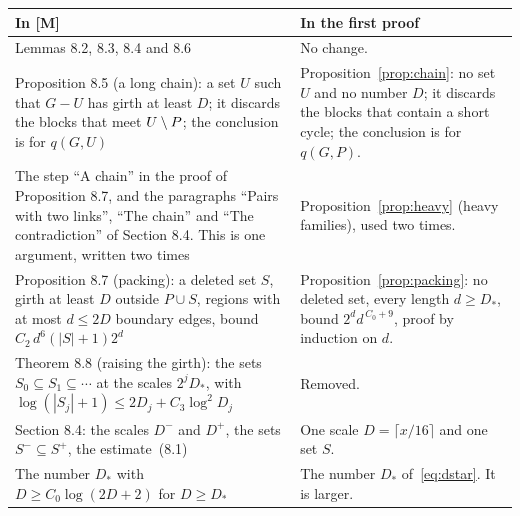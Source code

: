 \documentclass[11pt]{article}
\begin{document}
\begin{center}
\small
\begin{tabular}{@{}p{7.1cm}p{7.1cm}@{}}
\toprule
In [M] & In the first proof\\
\midrule
Lemmas 8.2, 8.3, 8.4 and 8.6 & No change.\\\addlinespace
Proposition 8.5 (a long chain): a set $U$ such that $G-U$ has girth at least $D$; it discards the
blocks that meet $U\setminus P$; the conclusion is for $q(G,U)$ &
Proposition~\ref{prop:chain}: no set $U$ and no number $D$; it discards the blocks that contain
a short cycle; the conclusion is for $q(G,P)$.\\\addlinespace
The step ``A chain'' in the proof of Proposition 8.7, and the paragraphs ``Pairs with two
links'', ``The chain'' and ``The contradiction'' of Section 8.4. This is one argument, written two
times &
Proposition~\ref{prop:heavy} (heavy families), used two times.\\\addlinespace
Proposition 8.7 (packing): a deleted set $S$, girth at least $D$ outside $P\cup S$, regions with
at most $d\le2D$ boundary edges, bound $C_2\,d^{6}(|S|+1)2^{d}$ &
Proposition~\ref{prop:packing}: no deleted set, every length $d\ge D_*$, bound
$2^{d}d^{\,C_0+9}$, proof by induction on $d$.\\\addlinespace
Theorem 8.8 (raising the girth): the sets $S_0\subseteq S_1\subseteq\cdots$ at the scales
$2^{j}D_*$, with $\log(|S_j|+1)\le2D_j+C_3\log^{2}D_j$ & Removed.\\\addlinespace
Section 8.4: the scales $D^{-}$ and $D^{+}$, the sets $S^{-}\subseteq S^{+}$, the
estimate~(8.1) & One scale $D=\lceil x/16\rceil$ and one set $S$.\\\addlinespace
The number $D_*$ with $D\ge C_0\log(2D+2)$ for $D\ge D_*$ & The number $D_*$
of~\eqref{eq:dstar}. It is larger.\\
\bottomrule
\end{tabular}
\end{center}
\end{document}
